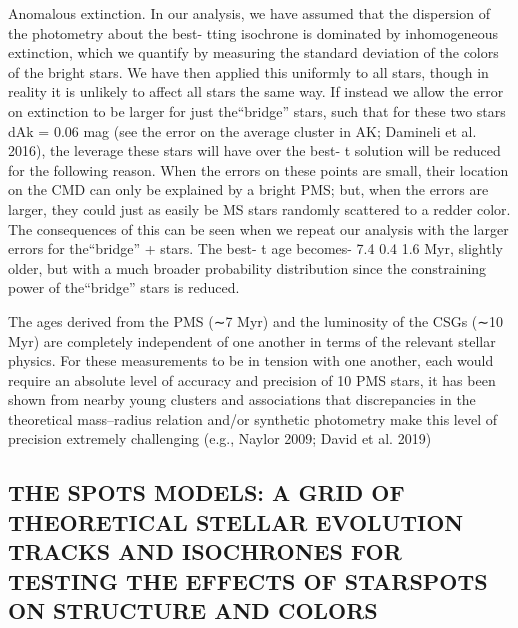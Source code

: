 \documentclass[../main.tex]{subfiles}
\begin{document}

Anomalous extinction. In our analysis, we have assumed
that the dispersion of the photometry about the best- tting
isochrone is dominated by inhomogeneous extinction, which
we quantify by measuring the standard deviation of the colors
of the bright stars. We have then applied this uniformly to all
stars, though in reality it is unlikely to affect all stars the same
way. If instead we allow the error on extinction to be larger for
just the“bridge” stars, such that for these two stars dAk = 0.06
mag (see the error on the average cluster in AK; Damineli et al.
2016), the leverage these stars will have over the best- t
solution will be reduced for the following reason. When the
errors on these points are small, their location on the CMD can
only be explained by a bright PMS; but, when the errors are
larger, they could just as easily be MS stars randomly scattered
to a redder color. The consequences of this can be seen when
we repeat our analysis with the larger errors for the“bridge”
+
stars. The best- t age becomes-
7.4 0.4
1.6 Myr, slightly older,
but with a much broader probability distribution since the
constraining power of the“bridge” stars is reduced.

The ages
derived from the PMS (∼7 Myr) and the luminosity of the
CSGs (∼10 Myr) are completely independent of one another in
terms of the relevant stellar physics. For these measurements to
be in tension with one another, each would require an absolute
level of accuracy and precision of 10%
PMS stars, it has been shown from nearby young clusters and
associations that discrepancies in the theoretical mass–radius
relation and/or synthetic photometry make this level of
precision extremely challenging (e.g., Naylor 2009; David
et al. 2019)

\subsection{THE SPOTS MODELS: A GRID OF THEORETICAL STELLAR EVOLUTION TRACKS AND ISOCHRONES
	FOR TESTING THE EFFECTS OF STARSPOTS ON STRUCTURE AND COLORS}


\end{document}
